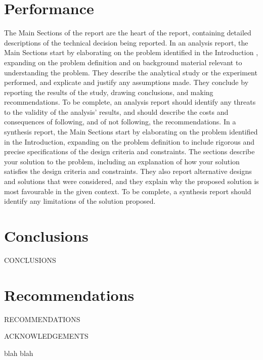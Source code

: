 \documentclass[12pt]{article}
\begin{document}
\section{Performance}
The Main Sections of the report are the heart of the report, containing detailed descriptions of the technical decision being reported. In an analysis report, the Main Sections start by elaborating on the problem identified in the Introduction , expanding on the problem definition and on background material relevant to understanding the problem. They describe the analytical study or the experiment performed, and explicate and justify any assumptions made. They conclude by reporting the results of the study, drawing conclusions, and making recommendations. To be complete, an analysis report should identify any threats to the validity of the analysis' results, and should describe the costs and consequences of following, and of not following, the recommendations. In a synthesis report, the Main Sections start by elaborating on the problem identified in the Introduction, expanding on the problem definition to include rigorous and precise specifications of the design criteria and constraints. The sections describe your solution to the problem, including an explanation of how your solution satisfies the design criteria and constraints. They also report alternative designs and solutions that were considered, and they explain why the proposed solution is most favourable in the given context. To be complete, a synthesis report should identify any limitations of the solution proposed.



\section{Conclusions}
CONCLUSIONS


\section{Recommendations}
RECOMMENDATIONS

\newpage



\newpage


ACKNOWLEDGEMENTS
\newpage


{}
blah blah
\newpage
\end{document}
